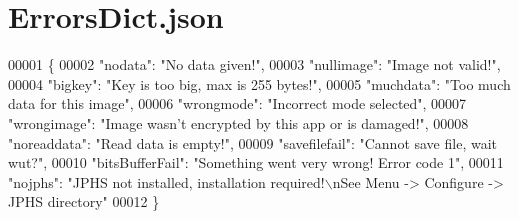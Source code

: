 \hypertarget{_errors_dict_8json_source}{}\section{Errors\+Dict.\+json}
\label{_errors_dict_8json_source}

\begin{DoxyCode}
00001 \{
00002     "nodata": "No data given!",
00003     "nullimage": "Image not valid!",
00004     "bigkey": "Key is too big, max is 255 bytes!",
00005     "muchdata": "Too much data for this image",
00006     "wrongmode": "Incorrect mode selected",
00007     "wrongimage": "Image wasn't encrypted by this app or is damaged!",
00008     "noreaddata": "Read data is empty!",
00009     "savefilefail": "Cannot save file, wait wut?",
00010     "bitsBufferFail": "Something went very wrong! Error code 1",
00011     "nojphs": "JPHS not installed, installation required!\(\backslash\)nSee Menu -> Configure -> JPHS directory"
00012 \}
\end{DoxyCode}
